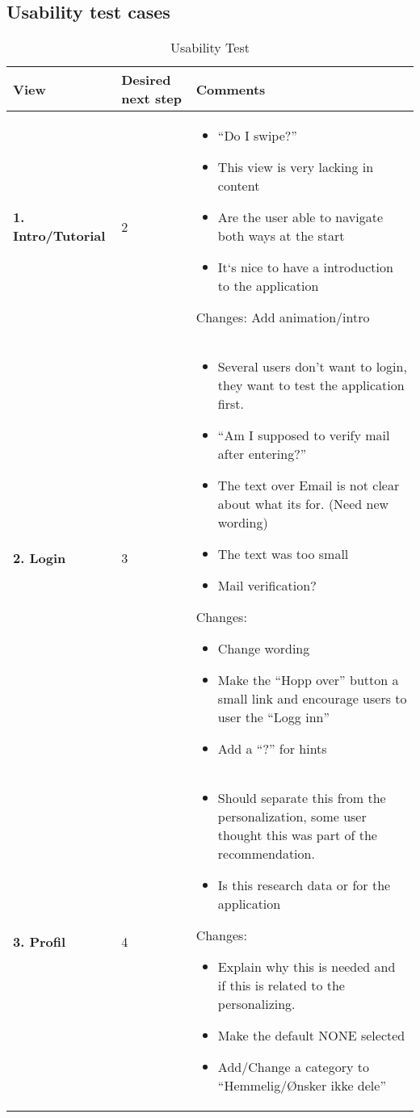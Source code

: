 \subsection{Usability test cases}
\renewcommand{\arraystretch}{2}%
\begin{center}
	\begin{longtable}{ | p{4cm} | p{3cm} | p{9cm}|}
		
		\caption[Usability test]{Usability Test } \label{Tab:usabilityTest}\\
		\hline
		\textbf{View} & \textbf{Desired next step} & \textbf{Comments}
		\\ \hline
		
		\textbf{1. Intro/Tutorial} & 2 & 
		\begin{itemize}
			\item “Do  I swipe?”
			\item This view is very lacking in content
			\item Are the user able to navigate both ways at the start
			\item It`s nice to have a introduction to the application
		\end{itemize}
		Changes:
		Add animation/intro
		\\\hline
		
		\textbf{2. Login} & 3  & 
		\begin{itemize}
			\item Several users don’t want to login, they want to test the application first.
			\item “Am I supposed to verify mail after entering?”
			\item	The text over Email is not clear about  what its for. (Need new wording)
			\item The text was too small
			\item Mail verification?
		\end{itemize}
		Changes:
		\begin{itemize}
			\item Change wording
			\item Make the “Hopp over” button a small link and encourage users to user the “Logg inn”
			\item  Add a “?” for hints
		\end{itemize}
		\\\hline
		
		\textbf{3. Profil} & 4 & 
		\begin{itemize}
			\item Should separate this from the personalization, some user thought this was part of the recommendation. 
			\item Is this research data or for the application
		\end{itemize}
		Changes:
		\begin{itemize}
			\item Explain why this is needed and if this is related to the personalizing.
			\item Make the default NONE selected
			\item Add/Change a category to “Hemmelig/Ønsker ikke dele”
		\end{itemize}
		\\\hline
		

\end{longtable}
\end{center}
